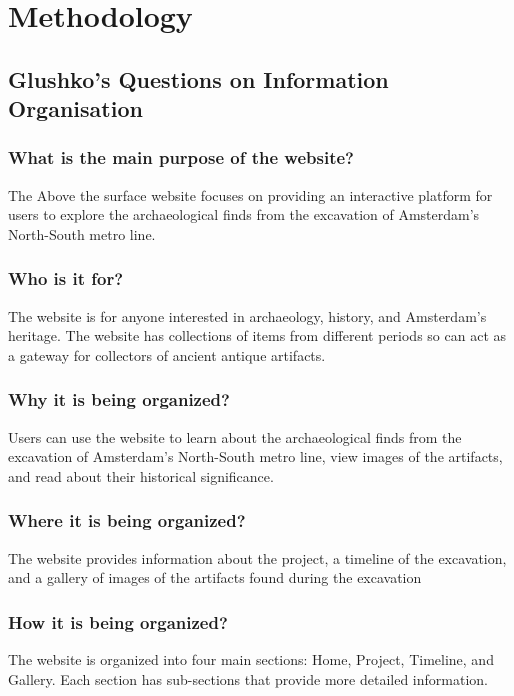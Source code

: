 \section {Methodology}

\subsection{Glushko's Questions on Information Organisation}

\subsubsection{What is the main purpose of the website?}
The Above the surface website focuses on providing an interactive platform for users to explore the archaeological finds from the excavation of Amsterdam’s North-South metro line.

\subsubsection{Who is it for?}
The website is for anyone interested in archaeology, history, and Amsterdam’s heritage. The website has collections of items from different periods so can act as a gateway for collectors of ancient antique artifacts.

\subsubsection{Why it is being organized?}
Users can use the website to learn about the archaeological finds from the excavation of Amsterdam’s North-South metro line, view images of the artifacts, and read about their historical significance.

\subsubsection{Where it is being organized?}
The website provides information about the project, a timeline of the excavation, and a gallery of images of the artifacts found during the excavation

\subsubsection{How it is being organized?}
The website is organized into four main sections: Home, Project, Timeline, and Gallery. Each section has sub-sections that provide more detailed information.

